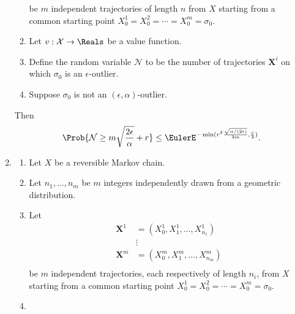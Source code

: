\documentclass[12pt]{article}
\begin{document}
\begin{enumerate}
\begin{theorem}
\begin{enumerate}
                    be \( m \) independent trajectories of length \( n \)
                    from \( X \) starting from a common starting point \(
                    X_0^1 = X_0^2 = \cdots = X_0^m = \sigma_0 \).
                \item
                    Let \( v :  \mathcal{X} \to \Reals \) be a value
                    function.
                \item
                    Define the random variable \( \mathcal{N} \) to be
                    the number of trajectories \( \mathbf{X}^i \) on
                    which \( \sigma_0 \) is an \( \epsilon \)-outlier.
                \item
                    Suppose \( \sigma_0 \) is not an \( (\epsilon,
                    \alpha) \)-outlier.
            \end{enumerate}
            Then
            \[
                \Prob{\mathcal{N} \ge m \sqrt{\frac{2\epsilon}{\alpha}}
                + r} \le \EulerE^{-\min(r^2 \frac{\sqrt{\alpha/(2\epsilon)}}
                {3m}, \frac{r} {3})}.
            \]
        \end{theorem}
    \item
        \begin{theorem}
            \label{thm:parallelsignificance:thm6point1}
            \begin{enumerate}
                \item
                    Let \( X \) be a reversible Markov chain.
                \item
                    Let \( n_1, \dots, n_m \) be \( m \) integers
                    independently drawn from a geometric distribution.
                \item
                    Let
                    \begin{align*}
                        \mathbf{X}^1 &= (X_0^1, X_1^1, \dots, X_{n_1}^1
                        )\\
                        &\vdots \\
                        \mathbf{X}^m &= (X_0^m, X_1^m, \dots, X_{n_m}^m
                        )\\
                    \end{align*}
                    be \( m \) independent trajectories, each
                    respectively of length \( n_{i} \), from \( X \)
                    starting from a common starting point \( X_0^1 = X_0^2
                    = \cdots = X_0^m = \sigma_0 \).
                \item

\end{enumerate}
\end{theorem}
\end{enumerate}
\end{document}

